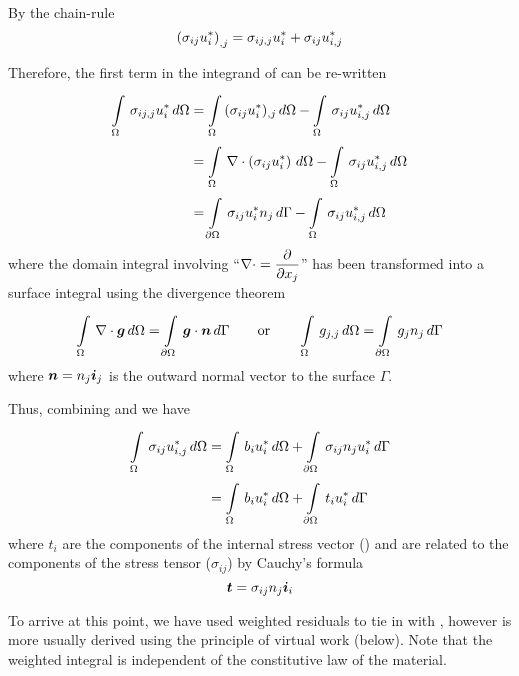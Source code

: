 By the chain-rule
\begin{displaymath}
  \left( \sigma_{ij}u_{i}^{*} \right)_{,j} = \sigma_{ij,j}u_{i}^{*} +
  \sigma_{ij}u_{i,j}^{*}
\end{displaymath}

Therefore, the first term in the integrand of  can be
re-written
\begin{align}
     \displaystyle\int\limits_{\Omega}^{} \,\sigma_{ij,j} u_{i}^{*}\,d\Omega  
  &=    \displaystyle\int\limits_{\Omega}^{} \,(\sigma_{ij} u_{i}^{*})_{,j}\,d\Omega   - 
     \displaystyle\int\limits_{\Omega}^{} \,\sigma_{ij}u_{i,j}^{*}\,d\Omega   \nonumber \\
  &=    \displaystyle\int\limits_{\Omega}^{} \, \nabla\cdot\left( \sigma_{ij} u_{i}^{*}  \right) \,d\Omega  
    -    \displaystyle\int\limits_{\Omega}^{} \,\sigma_{ij} u_{i,j}^{*}\,d\Omega   \nonumber\\
  &=   \displaystyle\int\limits_{\partial \Omega}^{} \,\sigma_{ij} u_{i}^{*}n_{j}\,d\Gamma 
  -    \displaystyle\int\limits_{\Omega}^{} \,\sigma_{ij} u_{i,j}^{*}\,d\Omega  
  \label{eqn:divtheory}
\end{align}
where the domain integral involving ``$ \nabla\cdot  =  \dfrac{\partial }{\partial x_{j}} $'' has been
transformed into a surface integral using the divergence theorem
\begin{displaymath}
  \goneint{\diverg{\vect{g}}}{\Omega} = \gint{\del
  \Omega}{}{\dotprod{\vect{g}}{\vect{n}}}{\Gamma} \qquad \text{or} \qquad
  \goneint{g_{j,j}}{\Omega} = \gint{\del \Omega}{}{g_{j} n_{j}}{\Gamma}
\end{displaymath}
where $\vect{n} = n_{j}\vect{i}_{j}$ is the outward normal vector to the
surface $\Gamma$.

Thus, combining  and  we have
\begin{align}
     \displaystyle\int\limits_{\Omega}^{} \,\sigma_{ij} u_{i,j}^{*}\,d\Omega   &=
     \displaystyle\int\limits_{\Omega}^{} \,b_{i} u_{i}^{*}\,d\Omega   +   \displaystyle\int\limits_{\partial \Omega}^{} \,\sigma_{ij} n_{j}u_{i}^{*}\,d\Gamma  \nonumber \\ &=    \displaystyle\int\limits_{\Omega}^{} \,b_{i} u_{i}^{*}\,d\Omega   +   \displaystyle\int\limits_{\partial \Omega}^{} \,t_{i} u_{i}^{*}\,d\Gamma 
  \label{eqn:virtws}
\end{align}
where $t_{i}$ are the components of the internal stress vector () and
are related to the components of the stress tensor ($\sigma_{ij}$) by Cauchy's
formula
\begin{equation}
\vect{t} = \sigma_{ij}n_{j}\vect{i}_{i}
\label{eqn:cauchyseqn}
\end{equation}

To arrive at this point, we have used weighted residuals to tie in with
, however  is more usually derived
using the principle of virtual work (below). Note that the weighted integral
 is independent of the constitutive law of the material.


